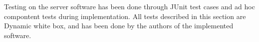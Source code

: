 Testing on the server software has been done through JUnit test cases and ad hoc compontent tests during implementation.
All tests described in this section are Dynamic white box, and has been done by the authors of the implemented software.

